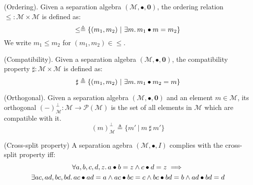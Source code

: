  (Ordering). Given a separation algebra $(\mathcal{M}, \bullet, \mathbf{0})$, the ordering relation $\leq : \mathcal{M} \times \mathcal{M}$ is defined as:
\[
	\leq \triangleq \{ (m_1, m_2)\ |\ \exists m \ldotp m_1 \bullet m = m_2 \}
\]
We write $m_1 \leq m_2$ for $(m_1, m_2) \in \leq$.

 (Compatibility). Given a separation algebra $(\mathcal{M}, \bullet, \mathbf{0})$, the compatibility property $\sharp : \mathcal{M} \times \mathcal{M}$ is defined as:
\[
	\sharp \triangleq \{ (m_1, m_2)\ |\ \exists m \ldotp m_1 \bullet m_2 = m \}
\]

 (Orthogonal). Given a separation algebra $(\mathcal{M}, \bullet, \mathbf{0})$ and an element $m \in \mathcal{M}$, its orthogonal $(-)^\bot_\mathcal{M} : \mathcal{M} \rightarrow \mathcal{P}(\mathcal{M})$ is the set of all elements in $\mathcal{M}$ which are compatible with it.
\[
	(m)^\bot_\mathcal{M} \triangleq \{m'\ |\ m\ \sharp\ m' \}
\]

 (Cross-split property) A separation agebra $(\mathcal{M}, \bullet, I)$ complies with the cross-split property iff:
\begin{gather*}
	\forall a, b, c, d, z \ldotp a \bullet b = z \land c \bullet d = z \implies \\ \exists ac, ad, bc, bd \ldotp ac \bullet ad = a \land ac \bullet bc = c \land bc \bullet bd = b \land ad \bullet bd = d
\end{gather*}

\newpage



\newpage

